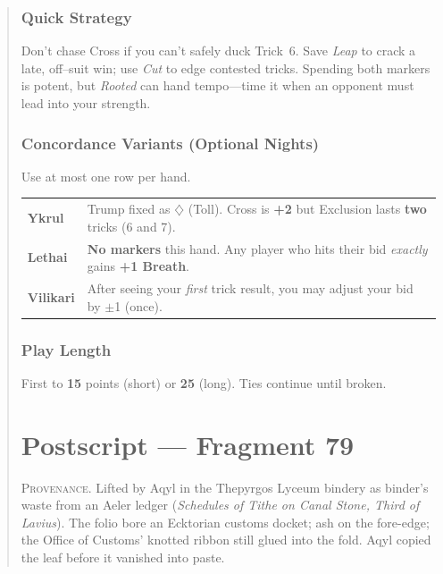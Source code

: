 \documentclass[11pt]{article}
\begin{document}
\begin{quote}
\subsubsection*{Quick Strategy}
Don’t chase Cross if you can’t safely duck Trick~6. Save \emph{Leap} to crack a late,
off–suit win; use \emph{Cut} to edge contested tricks. Spending both markers is potent,
but \emph{Rooted} can hand tempo—time it when an opponent must lead into your strength.

\subsubsection*{Concordance Variants (Optional Nights)}
Use at most one row per hand.
\medskip

\noindent\begin{tabularx}{\linewidth}{@{}>{\bfseries}l X@{}}
\toprule
Ykrul & Trump fixed as $\diamondsuit$ (Toll). Cross is \textbf{+2} but Exclusion lasts \textbf{two} tricks (6 and 7).\\
Lethai & \textbf{No markers} this hand. Any player who hits their bid \emph{exactly} gains \textbf{+1 Breath}.\\
Vilikari & After seeing your \emph{first} trick result, you may adjust your bid by $\pm$1 (once).\\
\bottomrule
\end{tabularx}

\subsubsection*{Play Length}
First to \textbf{15} points (short) or \textbf{25} (long). Ties continue until broken.


\clearpage


\section*{Postscript — Fragment 79}
\label{sec:postscript}

\medskip
\noindent\small\textsc{Provenance.} Lifted by Aqyl in the Thepyrgos Lyceum bindery as binder’s waste from an Aeler ledger (\emph{Schedules of Tithe on Canal Stone, Third of Lavius}). The folio bore an Ecktorian customs docket; ash on the fore-edge; the Office of Customs’ knotted ribbon still glued into the fold. Aqyl copied the leaf before it vanished into paste.\normalsize


\end{quote}
\end{document}
